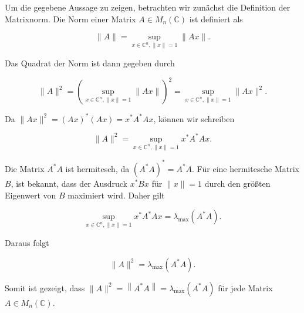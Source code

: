 Um die gegebene Aussage zu zeigen, betrachten wir zunächst die Definition der Matrixnorm. Die Norm einer Matrix $A \in M_n(\mathbb{C})$ ist definiert als

\[
\|A\| = \sup_{x \in \mathbb{C}^n, \|x\| = 1} \|Ax\|.
\]

Das Quadrat der Norm ist dann gegeben durch

\[
\|A\|^2 = \left( \sup_{x \in \mathbb{C}^n, \|x\| = 1} \|Ax\| \right)^2 = \sup_{x \in \mathbb{C}^n, \|x\| = 1} \|Ax\|^2.
\]

Da $\|Ax\|^2 = (Ax)^* (Ax) = x^* A^* A x$, können wir schreiben

\[
\|A\|^2 = \sup_{x \in \mathbb{C}^n, \|x\| = 1} x^* A^* A x.
\]

Die Matrix $A^* A$ ist hermitesch, da $(A^* A)^* = A^* A$. Für eine hermitesche Matrix $B$, ist bekannt, dass der Ausdruck $x^* B x$ für $\|x\| = 1$ durch den größten Eigenwert von $B$ maximiert wird. Daher gilt

\[
\sup_{x \in \mathbb{C}^n, \|x\| = 1} x^* A^* A x = \lambda_{\max}(A^* A).
\]

Daraus folgt

\[
\|A\|^2 = \lambda_{\max}(A^* A).
\]

Somit ist gezeigt, dass $\|A\|^2 = \left\|A^* A\right\| = \lambda_{\max }\left(A^* A\right)$ für jede Matrix $A \in M_n(\mathbb{C})$.